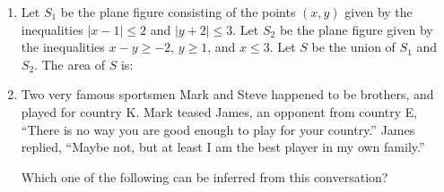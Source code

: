 \documentclass[journal]{IEEEtran}
\begin{document}
\begin{enumerate}[leftmargin=0pt]
    \begin{enumerate}
    \end{enumerate}





  
    \item Let $S_1$ be the plane figure consisting of the points $(x, y)$ given by the inequalities $|x - 1| \leq 2$ and $|y + 2| \leq 3$. Let $S_2$ be the plane figure given by the inequalities $x - y \geq -2$, $y \geq 1$, and $x \leq 3$. Let $S$ be the union of $S_1$ and $S_2$. The area of $S$ is:
    \begin{enumerate}
    \end{enumerate}



  
    \item Two very famous sportsmen Mark and Steve happened to be brothers, and played for country K. Mark teased James, an opponent from country E, ``There is no way you are good enough to play for your country.'' James replied, ``Maybe not, but at least I am the best player in my own family.''

    Which one of the following can be inferred from this conversation?
    \begin{enumerate}
    \end{enumerate}



\end{enumerate}
\end{document}
